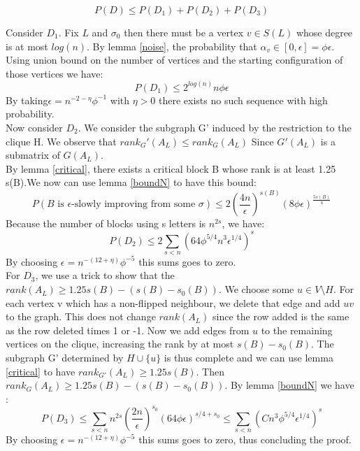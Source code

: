 \begin{equation*}
P(D) \leq P(D_1) + P(D_2) + P(D_3)
\end{equation*}

Consider $D_1$. Fix $L$ and $\sigma_0$ then there must be a vertex $v \in S(L)$ whose degree is at most $log(n)$. By lemma  \ref{noise}, the probability that $\alpha_v \in [0, \epsilon] = \phi \epsilon$. Using union bound on the number of vertices and the starting configuration of those vertices we have:
\begin{equation}
P(D_1)  \leq 2^{log(n)}n \phi \epsilon
\end{equation}
By taking$\epsilon = n^{-2 - \eta} \phi^{-1}$ with $\eta > 0$ there exists no such sequence with high probability. \\

Now consider $D_2$. We consider the subgraph G' induced by the restriction to the clique H. We observe that $rank_G'(A_L) \leq rank_G(A_L)$ Since $G'(A_L)$ is a submatrix of $G(A_L)$.\\ 
By lemma \ref{critical}, there exists a critical block B whose rank is at least 1.25 s(B).We now can use lemma \ref{boundN} to have this bound:
\begin{equation*}
P(B \text{ is }\epsilon \text {-slowly improving from some }\sigma) \leq 2(\frac{4n}{\epsilon})^{s(B)}(8\phi\epsilon)^{\frac{5s(B)}{4}}
\end{equation*}
Because the number of blocks using s letters is $n^{2s}$, we have:
\begin{equation*}
P(D_2) \leq 2 \sum_{s < n}(64\phi^{5/4}n^3\epsilon^{1/4})^s
\end{equation*}
By choosing $\epsilon = n^{-(12 + \eta)}\phi^{-5}$ this sums goes to zero.\\

For $D_3$, we use a trick to show that the $rank(A_L) \geq 1.25s(B) - (s(B) - s_0(B))$. We choose some $u \in V \setminus H$. For each vertex v which has a non-flipped neighbour, we delete that edge and add $uv$ to the graph. This does not change $rank(A_L)$ since the row added is the same as the row deleted times 1 or -1. Now we add edges from $u$ to the remaining vertices on the clique, increasing the rank by at most $s(B) - s_0(B)$. The subgraph G' determined by $H \cup \{u\}$ is thus complete and we can use  lemma \ref{critical} to have $rank_{G'}(A_L) \geq 1.25 s(B)$. Then $rank_G(A_L) \geq 1.25s(B) - (s(B) - s_0(B))$.
By lemma \ref{boundN} we have :
\begin{equation*}
P(D_3) \leq  \sum_{s < n}n^{2s}(\dfrac{2n}{\epsilon})^{s_0}(64\phi\epsilon)^{s/4 + s_0} \leq \sum_{s < n}(Cn^{3}\phi^{5/4}\epsilon^{1/4})^{s}
\end{equation*}
By choosing $\epsilon = n^{-(12 + \eta)}\phi^{-5}$ this sums goes to zero, thus concluding the proof.